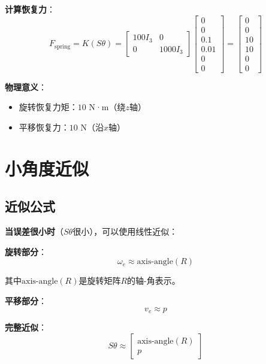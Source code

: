 \documentclass[12pt,a4paper]{article}
\begin{document}
\textbf{计算恢复力}：
\begin{equation}
F_{\text{spring}} = K(S\theta) = \begin{bmatrix} 100 I_3 & 0 \\ 0 & 1000 I_3 \end{bmatrix} \begin{bmatrix} 0 \\ 0 \\ 0.1 \\ 0.01 \\ 0 \\ 0 \end{bmatrix} = \begin{bmatrix} 0 \\ 0 \\ 10 \\ 10 \\ 0 \\ 0 \end{bmatrix}
\end{equation}

\textbf{物理意义}：
\begin{itemize}
\item 旋转恢复力矩：$10$ N·m（绕$z$轴）
\item 平移恢复力：$10$ N（沿$x$轴）
\end{itemize}

\section{小角度近似}

\subsection{近似公式}

\textbf{当误差很小时}（$S\theta$很小），可以使用线性近似：

\textbf{旋转部分}：
\begin{equation}
\omega_e \approx \text{axis-angle}(R)
\end{equation}

其中$\text{axis-angle}(R)$是旋转矩阵$R$的轴-角表示。

\textbf{平移部分}：
\begin{equation}
v_e \approx p
\end{equation}

\textbf{完整近似}：
\begin{equation}
S\theta \approx \begin{bmatrix} \text{axis-angle}(R) \\ p \end{bmatrix}
\end{equation}
\end{document}

